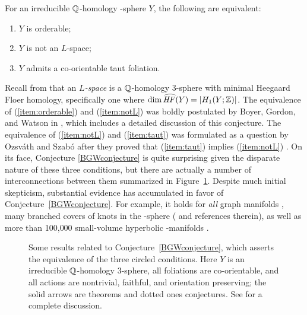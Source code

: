 \documentclass[tikz, sepfignums, defaultenums]{nmd/article}
\begin{document}
\begin{conjecture}\label{BGWconjecture}
  For an irreducible ${\mathbb Q}$-homology \3-sphere $Y$, the following
  are equivalent:
  \begin{enumerate}
  \item \label{item:orderable}
    $Y$ is orderable;
  \item \label{item:notL}
    $Y$ is not an $L$-space; 
  \item \label{item:taut}
    $Y$ admits a co-orientable taut foliation. 
  \end{enumerate}
\end{conjecture}
Recall from \cite{OSLensSpace2005} that an \emph{$L$-space} is a
${\mathbb Q}$-homology 3-sphere with minimal Heegaard Floer homology,
specifically one where $\dim \HFhat(Y) = |H_1(Y;\Z)|$.  The
equivalence of (\ref{item:orderable}) and (\ref{item:notL}) was boldly
postulated by Boyer, Gordon, and Watson in
\cite{BoyerGordonWatson2013}, which includes a detailed discussion of
this conjecture.  The equivalence of (\ref{item:notL}) and
(\ref{item:taut}) was formulated as a question by Ozsv\'ath and Szab\'o
after they proved that (\ref{item:taut}) implies (\ref{item:notL})
\cite{OSgenusbounds2004, KazezRoberts2015, Bowden2015}.  On its face,
Conjecture \ref{BGWconjecture} is quite surprising given the disparate
nature of these three conditions, but there are actually a number of
interconnections between them summarized in Figure~\ref{fig:conj}.
Despite much initial skepticism, substantial evidence has accumulated
in favor of Conjecture~\ref{BGWconjecture}.  For example, it holds for
\emph{all} graph manifolds
\cite{HanselmanRasmussenRasmussenWatson2015, BoyerClay2014}, many
branched covers of knots in the \3-sphere (\cite{GordonLidman2014} and
references therein), as well as more than 100{,}000 small-volume
hyperbolic \3-manifolds \cite{Dunfield2015}.

\begin{figure}
  \begin{center}
    
  \end{center}
  \caption{Some results related to Conjecture~\ref{BGWconjecture},
    which asserts the equivalence of the three circled conditions.
    Here $Y$ is an irreducible ${\mathbb Q}$-homology 3-sphere, all
    foliations are co-orientable, and all actions are nontrivial,
    faithful, and orientation preserving; the solid arrows are
    theorems and dotted ones conjectures.  See
    \cite{BoyerGordonWatson2013} for a complete discussion.}
  \label{fig:conj}
\end{figure}
\end{document}
